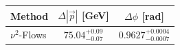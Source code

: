     \begin{tabular}{lcc}
        \toprule
        Method & $\Delta |\vec p|$ [GeV] & $\Delta \phi$ [rad] \\
        \midrule
        $\nu^2$-Flows & $75.04^{+0.09}_{-0.07}$ & $0.9627^{+0.0004}_{-0.0007}$ \\
        \bottomrule
    \end{tabular}